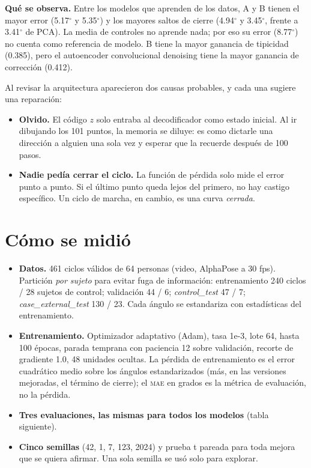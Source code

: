 \documentclass[11pt,a4paper]{article}
\newcommand{\gr}{$^\circ$}
\newcommand{\mae}{\textsc{mae}}
\begin{document}
\textbf{Qué se observa.} Entre los modelos que aprenden de los datos, A y B tienen el mayor error (5.17\gr{} y 5.35\gr{}) y los mayores saltos de cierre (4.94\gr{} y 3.45\gr{}, frente a 3.41\gr{} de PCA). La media de controles no aprende nada; por eso su error (8.77\gr{}) no cuenta como referencia de modelo. B tiene la mayor ganancia de tipicidad (0.385), pero el autoencoder convolucional denoising tiene la mayor ganancia de corrección (0.412).

\begin{intuicion}
Al revisar la arquitectura aparecieron dos causas probables, y cada una sugiere una reparación:
\begin{itemize}
\item \textbf{Olvido.} El código $z$ solo entraba al decodificador como estado inicial. Al ir dibujando los 101 puntos, la memoria se diluye: es como dictarle una dirección a alguien una sola vez y esperar que la recuerde después de 100 pasos.
\item \textbf{Nadie pedía cerrar el ciclo.} La función de pérdida solo mide el error punto a punto. Si el último punto queda lejos del primero, no hay castigo específico. Un ciclo de marcha, en cambio, es una curva \emph{cerrada}.
\end{itemize}
\end{intuicion}

\section{Cómo se midió}
\label{sec:proto}

\begin{itemize}
\item \textbf{Datos.} 461 ciclos válidos de 64 personas (video, AlphaPose a 30 fps). Partición \emph{por sujeto} para evitar fuga de información: entrenamiento 240 ciclos / 28 sujetos de control; validación 44 / 6; \emph{control\_test} 47 / 7; \emph{case\_external\_test} 130 / 23. Cada ángulo se estandariza con estadísticas del entrenamiento.
\item \textbf{Entrenamiento.} Optimizador adaptativo (Adam), tasa 1e-3, lote 64, hasta 100 épocas, parada temprana con paciencia 12 sobre validación, recorte de gradiente 1.0, 48 unidades ocultas. La pérdida de entrenamiento es el error cuadrático medio sobre los ángulos estandarizados (más, en las versiones mejoradas, el término de cierre); el \mae{} en grados es la métrica de evaluación, no la pérdida.
\item \textbf{Tres evaluaciones, las mismas para todos los modelos} (tabla siguiente).
\item \textbf{Cinco semillas} (42, 1, 7, 123, 2024) y prueba t pareada para toda mejora que se quiera afirmar. Una sola semilla se usó solo para explorar.
\end{itemize}
\end{document}
